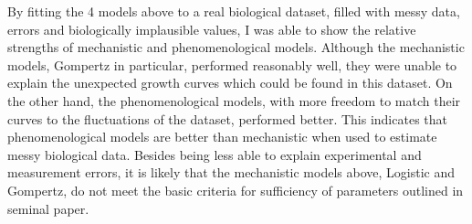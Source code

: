 \documentclass[11pt,a4wide,titlepage]{article}
\begin{document}
By fitting the 4 models above to a real biological dataset, filled with messy data, errors and biologically implausible values, I was able to show the relative strengths of mechanistic and phenomenological models. Although the mechanistic models, Gompertz in particular, performed reasonably well, they were unable to explain the unexpected growth curves which could be found in this dataset. On the other hand, the phenomenological models, with more freedom to match their curves to the fluctuations of the dataset, performed better. This indicates that phenomenological models are better than mechanistic when used to estimate messy biological data. Besides being less able to explain experimental and measurement errors, it is likely that the mechanistic models above, Logistic and Gompertz, do not meet the basic criteria for sufficiency of parameters outlined in \cite{levinsSTRATEGYMODELBUILDING1966} seminal paper.


\end{document}

